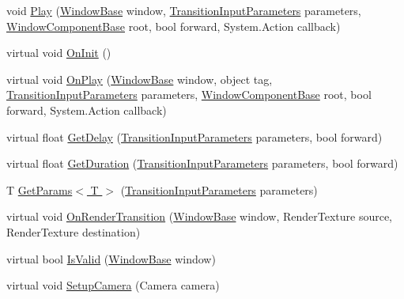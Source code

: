 \begin{DoxyCompactItemize}
\item 
void \hyperlink{class_unity_engine_1_1_u_i_1_1_windows_1_1_animations_1_1_transition_base_a958deb9348c0a3cbaeabc0a2a30238a4}{Play} (\hyperlink{class_unity_engine_1_1_u_i_1_1_windows_1_1_window_base}{Window\+Base} window, \hyperlink{class_unity_engine_1_1_u_i_1_1_windows_1_1_animations_1_1_transition_input_parameters}{Transition\+Input\+Parameters} parameters, \hyperlink{class_unity_engine_1_1_u_i_1_1_windows_1_1_window_component_base}{Window\+Component\+Base} root, bool forward, System.\+Action callback)
\item 
virtual void \hyperlink{class_unity_engine_1_1_u_i_1_1_windows_1_1_animations_1_1_transition_base_af1f2d64aa4f44f93711be04a8a246f12}{On\+Init} ()
\item 
virtual void \hyperlink{class_unity_engine_1_1_u_i_1_1_windows_1_1_animations_1_1_transition_base_a75105611e50a25fe4ff89aef491979d3}{On\+Play} (\hyperlink{class_unity_engine_1_1_u_i_1_1_windows_1_1_window_base}{Window\+Base} window, object tag, \hyperlink{class_unity_engine_1_1_u_i_1_1_windows_1_1_animations_1_1_transition_input_parameters}{Transition\+Input\+Parameters} parameters, \hyperlink{class_unity_engine_1_1_u_i_1_1_windows_1_1_window_component_base}{Window\+Component\+Base} root, bool forward, System.\+Action callback)
\item 
virtual float \hyperlink{class_unity_engine_1_1_u_i_1_1_windows_1_1_animations_1_1_transition_base_ab35c11b84cce6ff29e9d6e9924735fb2}{Get\+Delay} (\hyperlink{class_unity_engine_1_1_u_i_1_1_windows_1_1_animations_1_1_transition_input_parameters}{Transition\+Input\+Parameters} parameters, bool forward)
\item 
virtual float \hyperlink{class_unity_engine_1_1_u_i_1_1_windows_1_1_animations_1_1_transition_base_a30ebac3a2c134492a57f8b8f846a52e2}{Get\+Duration} (\hyperlink{class_unity_engine_1_1_u_i_1_1_windows_1_1_animations_1_1_transition_input_parameters}{Transition\+Input\+Parameters} parameters, bool forward)
\item 
T \hyperlink{class_unity_engine_1_1_u_i_1_1_windows_1_1_animations_1_1_transition_base_af75b7b69702039b8fbb8ed4afeb35597}{Get\+Params$<$ T $>$} (\hyperlink{class_unity_engine_1_1_u_i_1_1_windows_1_1_animations_1_1_transition_input_parameters}{Transition\+Input\+Parameters} parameters)
\item 
virtual void \hyperlink{class_unity_engine_1_1_u_i_1_1_windows_1_1_animations_1_1_transition_base_a3e8037b0dcbf8aadcb5192348c968ff5}{On\+Render\+Transition} (\hyperlink{class_unity_engine_1_1_u_i_1_1_windows_1_1_window_base}{Window\+Base} window, Render\+Texture source, Render\+Texture destination)
\item 
virtual bool \hyperlink{class_unity_engine_1_1_u_i_1_1_windows_1_1_animations_1_1_transition_base_aec40e605a827995915606a8052e5237a}{Is\+Valid} (\hyperlink{class_unity_engine_1_1_u_i_1_1_windows_1_1_window_base}{Window\+Base} window)
\item 
virtual void \hyperlink{class_unity_engine_1_1_u_i_1_1_windows_1_1_animations_1_1_transition_base_a751fa8ec9c985d89678590c01285b964}{Setup\+Camera} (Camera camera)
\end{DoxyCompactItemize}


